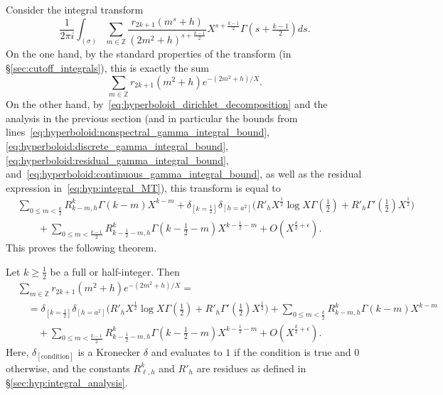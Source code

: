 Consider the integral transform
\begin{equation}
  \frac{1}{2\pi i} \int_{(\sigma)} \sum_{m \in \mathbb{Z}} \frac{r_{2k+1}{(m^s +
  h)}}{(2m^2 + h)^{s + \frac{k-1}{2}}} X^{s + \frac{k-1}{2}} \Gamma(s + \tfrac{k-1}{2})
  ds.
\end{equation}
On the one hand, by the standard properties of the transform (in
\S\ref{sec:cutoff_integrals}), this is exactly the sum
\begin{equation}
  \sum_{m \in \mathbb{Z}} r_{2k+1}(m^2 + h) e^{-(2m^2 + h)/X}.
\end{equation}
On the other hand, by~\eqref{eq:hyperboloid_dirichlet_decomposition} and the analysis in
the previous section (and in particular the bounds from
lines~\eqref{eq:hyperboloid:nonspectral_gamma_integral_bound},
\eqref{eq:hyperboloid:discrete_gamma_integral_bound},
\eqref{eq:hyperboloid:residual_gamma_integral_bound},
and~\eqref{eq:hyperboloid:continuous_gamma_integral_bound}, as well as the residual
expression in~\eqref{eq:hyp:integral_MT}), this transform is equal to
\begin{align}
  &\sum_{0 \leq m < \frac{k}{2}} R_{k-m, h}^k \Gamma(k-m) X^{k-m} + \delta_{[k =
\frac{1}{2}]} \delta_{[h = a^2]} \bigg( R'_h X^{\frac{1}{2}} \log X \Gamma(\tfrac{1}{2}) +
R'_h \Gamma'(\tfrac{1}{2}) X^{\frac{1}{2}} \bigg) \\
  &\qquad + \sum_{0 \leq m < \frac{k-1}{2}} R_{k - \frac{1}{2} - m,h}^k \Gamma(k -
  \tfrac{1}{2} - m) X^{k - \frac{1}{2} - m} + O(X^{\frac{k}{2} + \epsilon}).
\end{align}
This proves the following theorem.
\begin{theorem}\label{thm:hyperboloid:smooth_full}
  Let $k \geq \frac{1}{2}$ be a full or half-integer.
  Then
  \begin{align}
    &\sum_{m \in \mathbb{Z}} r_{2k+1}(m^2 + h) e^{-(2m^2 + h)/X} =\\
    &\quad =\delta_{[k = \frac{1}{2}]} \delta_{[h = a^2]} \bigg( R'_h X^{\frac{1}{2}} \log
    X \Gamma(\tfrac{1}{2}) + R'_h \Gamma'(\tfrac{1}{2}) X^{\frac{1}{2}} \bigg) + \sum_{0
    \leq m < \frac{k}{2}} R_{k-m, h}^k \Gamma(k-m) X^{k-m} \\
    &\qquad + \sum_{0 \leq m < \frac{k-1}{2}} R_{k - \frac{1}{2} - m,h}^k \Gamma(k -
    \tfrac{1}{2} - m) X^{k - \frac{1}{2} - m} + O(X^{\frac{k}{2} + \epsilon}).
  \end{align}
  Here, $\delta_{[\text{condition}]}$ is a Kronecker $\delta$ and evaluates to $1$ if the
  condition is true and $0$ otherwise, and the constants $R^k_{\ell, h}$ and $R'_h$ are
  residues as defined in \S\ref{sec:hyp:integral_analysis}.
\end{theorem}



